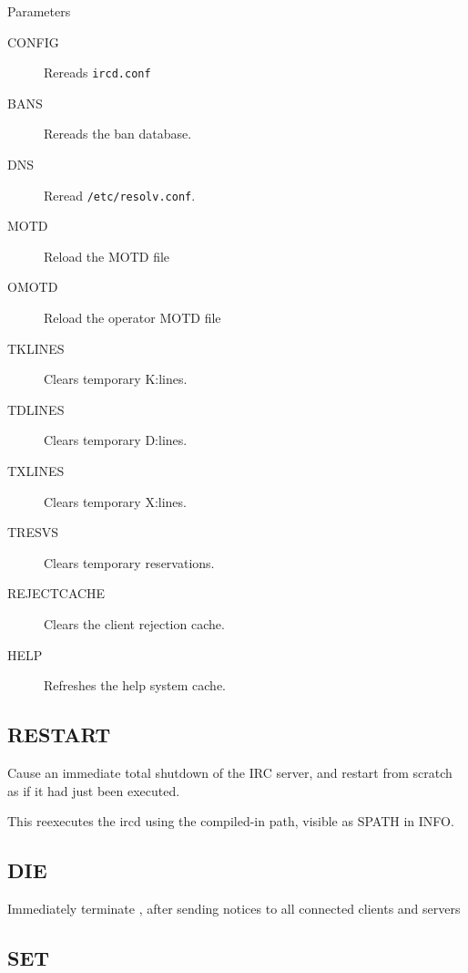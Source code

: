 {\sc Parameters}

\noindent
\begin{description}
\item[{CONFIG}]
	Rereads \nolinkurl{ircd.conf}

\item[{BANS}]
	Rereads the ban database.

\item[{DNS}]
	Reread \nolinkurl{/etc/resolv.conf}.

\item[{MOTD}]
	Reload the MOTD file

\item[{OMOTD}]
	Reload the operator MOTD file

\item[{TKLINES}]
	Clears temporary K:lines.

\item[{TDLINES}]
	Clears temporary D:lines.

\item[{TXLINES}]
	Clears temporary X:lines.

\item[{TRESVS}]
	Clears temporary reservations.

\item[{REJECTCACHE}]
	Clears the client rejection cache.

\item[{HELP}]
	Refreshes the help system cache.
\end{description}

\subsection{RESTART}


	Cause an immediate total shutdown of the IRC server, and restart from
	scratch as if it had just been executed.

	This reexecutes the ircd using the compiled-{}in path, visible as SPATH
	in INFO.

\subsection{DIE}

 
	Immediately terminate , after sending notices to all
	connected clients and servers

\subsection{SET}

